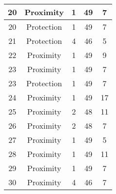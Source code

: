 \documentclass[results.tex]{subfiles}
\begin{document}
\begin{center}
\begin{tabular}{| c || c | c | c | c |}
            \hline
            20                      & Proximity                    & 1                      & 49                      & 7                    \\
            \hline
            20                      & Protection                   & 1                      & 49                      & 7                    \\
            \hline
            21                      & Protection                   & 4                      & 46                      & 5                    \\
            \hline
            22                      & Proximity                    & 1                      & 49                      & 9                    \\
            \hline
            23                      & Proximity                    & 1                      & 49                      & 7                    \\
            \hline
            23                      & Protection                   & 1                      & 49                      & 7                    \\
            \hline
            24                      & Proximity                    & 1                      & 49                      & 17                   \\
            \hline
            25                      & Proximity                    & 2                      & 48                      & 11                   \\
            \hline
            26                      & Proximity                    & 2                      & 48                      & 7                    \\
            \hline
            27                      & Proximity                    & 1                      & 49                      & 5                    \\
            \hline
            28                      & Proximity                    & 1                      & 49                      & 11                   \\
            \hline
            29                      & Proximity                    & 1                      & 49                      & 7                    \\
            \hline
            30                      & Proximity                    & 4                      & 46                      & 7                    \\

\end{tabular}
\end{center}
\end{document}

